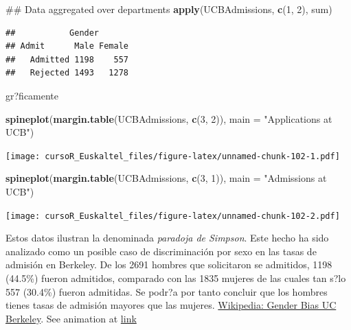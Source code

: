 \documentclass[]{book}
\newenvironment{Shaded}{\begin{snugshade}}{\end{snugshade}}
\newcommand{\KeywordTok}[1]{\textcolor[rgb]{0.13,0.29,0.53}{\textbf{#1}}}
\newcommand{\DataTypeTok}[1]{\textcolor[rgb]{0.13,0.29,0.53}{#1}}
\newcommand{\DecValTok}[1]{\textcolor[rgb]{0.00,0.00,0.81}{#1}}
\newcommand{\StringTok}[1]{\textcolor[rgb]{0.31,0.60,0.02}{#1}}
\newcommand{\NormalTok}[1]{#1}
\begin{document}
\begin{Shaded}
\begin{Highlighting}[]
\NormalTok{## Data aggregated over departments}
\KeywordTok{apply}\NormalTok{(UCBAdmissions, }\KeywordTok{c}\NormalTok{(}\DecValTok{1}\NormalTok{, }\DecValTok{2}\NormalTok{), sum)}
\end{Highlighting}
\end{Shaded}

\begin{verbatim}
##           Gender
## Admit      Male Female
##   Admitted 1198    557
##   Rejected 1493   1278
\end{verbatim}

gr?ficamente

\begin{Shaded}
\begin{Highlighting}[]
\KeywordTok{spineplot}\NormalTok{(}\KeywordTok{margin.table}\NormalTok{(UCBAdmissions, }\KeywordTok{c}\NormalTok{(}\DecValTok{3}\NormalTok{, }\DecValTok{2}\NormalTok{)),}
           \DataTypeTok{main =} \StringTok{"Applications at UCB"}\NormalTok{)}
\end{Highlighting}
\end{Shaded}

\texttt{[image: cursoR\_Euskaltel\_files/figure-latex/unnamed-chunk-102-1.pdf]}

\begin{Shaded}
\begin{Highlighting}[]
\KeywordTok{spineplot}\NormalTok{(}\KeywordTok{margin.table}\NormalTok{(UCBAdmissions, }\KeywordTok{c}\NormalTok{(}\DecValTok{3}\NormalTok{, }\DecValTok{1}\NormalTok{)),}
           \DataTypeTok{main =} \StringTok{"Admissions at UCB"}\NormalTok{)}
\end{Highlighting}
\end{Shaded}

\texttt{[image: cursoR\_Euskaltel\_files/figure-latex/unnamed-chunk-102-2.pdf]}

Estos datos ilustran la denominada \emph{paradoja de Simpson}. Este
hecho ha sido analizado como un posible caso de discriminación por sexo
en las tasas de admisión en Berkeley. De los 2691 hombres que
solicitaron se admitidos, 1198 (44.5\%) fueron admitidos, comparado con
las 1835 mujeres de las cuales tan s?lo 557 (30.4\%) fueron admitidas.
Se podr?a por tanto concluir que los hombres tienes tasas de admisión
mayores que las mujeres.
\href{https://en.wikipedia.org/wiki/Simpson\%27s_paradox\#UC_Berkeley_gender_bias}{Wikipedia:
Gender Bias UC Berkeley}. See animation at
\href{http://vudlab.com/simpsons/}{link}
\end{document}
